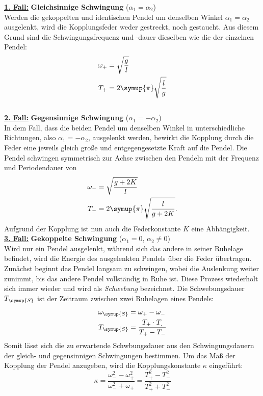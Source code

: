 \underline{\textbf{1. Fall:}} \textbf{Gleichsinnige Schwingung} ($\alpha_1=\alpha_2$) \\
Werden die gekoppelten und identischen Pendel um denselben Winkel $\alpha_1=\alpha_2$ ausgelenkt, wird die Kopplungsfeder weder gestreckt, noch gestaucht.
Aus diesem Grund sind die Schwingungsfrequenz und -dauer dieselben wie die der einzelnen Pendel:
\begin{align}
    \omega_{+} &= \sqrt{\frac{g}{l}} \notag \\ %
    T_{+} &= 2\symup{\pi}\sqrt{\frac{l}{g}} \label{eq:T+}
\end{align} \\


\underline{\textbf{2. Fall:}} \textbf{Gegensinnige Schwingung} ($\alpha_1=-\alpha_2$) \\
In dem Fall, dass die beiden Pendel um denselben Winkel in unterschiedliche Richtungen, also $\alpha_1=-\alpha_2$, ausgelenkt werden, bewirkt die
Kopplung durch die Feder eine jeweils gleich große und entgegengesetzte Kraft auf die Pendel. Die Pendel schwingen symmetrisch zur Achse zwischen den 
Pendeln mit der Frequenz und Periodendauer von
\begin{align}
    \omega_{-} &= \sqrt{\frac{g+2K}{l}} \notag \\ %
    T_{-} &= 2\symup{\pi} \sqrt{\frac{l}{g+2K}}. \label{eq:T-}
\end{align}
Aufgrund der Kopplung ist nun auch die Federkonstante $K$ eine Abhängigkeit. \\


\underline{\textbf{3. Fall:}} \textbf{Gekoppelte Schwingung} ($\alpha_1=0$, $\alpha_2\neq 0$) \\
Wird nur ein Pendel ausgelenkt, während sich das andere in seiner Ruhelage befindet, wird die Energie des ausgelenkten Pendels über die
Feder übertragen. Zunächst beginnt das Pendel langsam zu schwingen, wobei die Auslenkung weiter zunimmt, bis das andere Pendel vollständig in Ruhe ist.
Diese Prozess wiederholt sich immer wieder und wird als \textit{Schwebung} bezeichnet. Die Schwebungsdauer $T_{\symup{S}}$ ist der Zeitraum zwischen zwei Ruhelagen
eines Pendels:
\begin{align}
    \omega_{\symup{S}} &= \omega_{+} - \omega_{-} \notag \\ %
    T_{\symup{S}} &= \frac{T_{+}\cdot T_{.}}{T_{+}-T_{-}} \label{eq:T_S} 
\end{align} 
Somit lässt sich die zu erwartende Schwbungsdauer aus den Schwingungsdauern der gleich- und gegensinnigen Schwingungen bestimmen. Um das Maß der Kopplung
der Pendel anzugeben, wird die Kopplungskonstante $\kappa$ eingeführt:
\begin{equation}
    \kappa = \frac{\omega_{-}^2-\omega_{+}^2}{\omega_{-}^2+\omega_{+}} = \frac{T_{+}^2-T_{-}^2}{T_{+}^2+T_{-}^2} \label{eq:Kopplungskonstante}
\end{equation}


